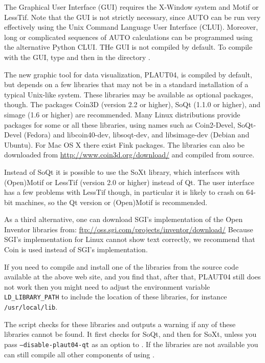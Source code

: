 \documentclass[12pt]{report}
\begin{document}
The Graphical User Interface (GUI) requires the {\cal X-Window} system
and {\cal Motif} or {\cal LessTif}.
Note that the GUI is not strictly necessary, since {\cal AUTO} can be
run very effectively using the Unix Command Language User Interface (CLUI).
Moreover, long or complicated sequences of {\cal AUTO} calculations can
be programmed using the alternative Python CLUI. 
THe GUI is not compiled by default. To compile
\AUTO with the GUI, type 
and then  in the directory .

The new graphic tool for \AUTO data visualization, PLAUT04, is
compiled by default, but depends on a few libraries that may not be
in a standard installation of a typical Unix-like
system. These libraries may be available as optional packages,
though. The packages Coin3D (version 2.2 or higher), SoQt
(1.1.0 or higher), and simage (1.6 or higher) are recommended.
Many Linux distributions provide packages for some or all
these libraries, using names such as Coin2-Devel, SoQt-Devel (Fedora)
and libcoin40-dev, libsoqt-dev, and libsimage-dev (Debian and Ubuntu).
For Mac OS X there exist Fink packages.
The libraries can also be downloaded from
\url{http://www.coin3d.org/download/} and compiled from source.

Instead of SoQt it is possible to use the SoXt library, which
interfaces with (Open)Motif or LessTif (version 2.0 or higher)
instead of Qt. The user interface has a few problems with LessTif
though, in particular it is likely to crash on 64-bit machines, so the
Qt version or (Open)Motif is recommended.

As a third alternative, one can download SGI's implementation of the
Open Inventor libraries from:
\url{ftp://oss.sgi.com/projects/inventor/download/}
Because SGI's implementation for Linux cannot show text correctly, 
we recommend that Coin is used instead of SGI's implementation. 

If you need to compile and install one of the libraries
from the source code available at the above web site, and you
find that, after that, PLAUT04 still does not work then you might need to
adjust the environment variable {\tt LD\_LIBRARY\_PATH} to include
the location of these libraries, for instance {\tt /usr/local/lib}.

The  script checks
for these libraries and outputs a warning if any of these libraries
cannot be found. It first checks for SoQt, and then for SoXt, unless
you pass {\tt --disable-plaut04-qt} as an option to .
If the libraries are not available you can still compile
all other components of \AUTO using .
\end{document}
